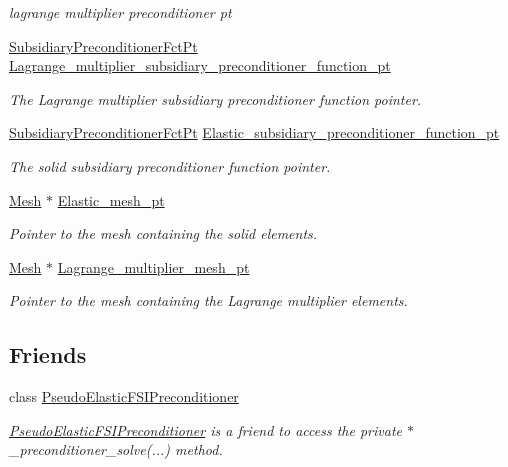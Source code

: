 \begin{DoxyCompactItemize}
\begin{DoxyCompactList}\small\item\em lagrange multiplier preconditioner pt \end{DoxyCompactList}\item 
\hyperlink{classoomph_1_1PseudoElasticPreconditioner_a1462e1ef48ed2668c06dfd36c783d1a5}{Subsidiary\+Preconditioner\+Fct\+Pt} \hyperlink{classoomph_1_1PseudoElasticPreconditioner_a0206c1e2da88da8948f2d560e8376aa3}{Lagrange\+\_\+multiplier\+\_\+subsidiary\+\_\+preconditioner\+\_\+function\+\_\+pt}
\begin{DoxyCompactList}\small\item\em The Lagrange multiplier subsidiary preconditioner function pointer. \end{DoxyCompactList}\item 
\hyperlink{classoomph_1_1PseudoElasticPreconditioner_a1462e1ef48ed2668c06dfd36c783d1a5}{Subsidiary\+Preconditioner\+Fct\+Pt} \hyperlink{classoomph_1_1PseudoElasticPreconditioner_aa3ca9f5ccba13b8a2038afb386f73b2d}{Elastic\+\_\+subsidiary\+\_\+preconditioner\+\_\+function\+\_\+pt}
\begin{DoxyCompactList}\small\item\em The solid subsidiary preconditioner function pointer. \end{DoxyCompactList}\item 
\hyperlink{classoomph_1_1Mesh}{Mesh} $\ast$ \hyperlink{classoomph_1_1PseudoElasticPreconditioner_aba765545c62b9dc52f7c2ea25ea13177}{Elastic\+\_\+mesh\+\_\+pt}
\begin{DoxyCompactList}\small\item\em Pointer to the mesh containing the solid elements. \end{DoxyCompactList}\item 
\hyperlink{classoomph_1_1Mesh}{Mesh} $\ast$ \hyperlink{classoomph_1_1PseudoElasticPreconditioner_a9d167073db4ade6ba70f036c4ab926dd}{Lagrange\+\_\+multiplier\+\_\+mesh\+\_\+pt}
\begin{DoxyCompactList}\small\item\em Pointer to the mesh containing the Lagrange multiplier elements. \end{DoxyCompactList}\end{DoxyCompactItemize}
\subsection*{Friends}
\begin{DoxyCompactItemize}
\item 
class \hyperlink{classoomph_1_1PseudoElasticPreconditioner_aaaea2b4795566f81945597254305249d}{Pseudo\+Elastic\+F\+S\+I\+Preconditioner}
\begin{DoxyCompactList}\small\item\em \hyperlink{classoomph_1_1PseudoElasticFSIPreconditioner}{Pseudo\+Elastic\+F\+S\+I\+Preconditioner} is a friend to access the private $\ast$\+\_\+preconditioner\+\_\+solve(...) method. \end{DoxyCompactList}\end{DoxyCompactItemize}
